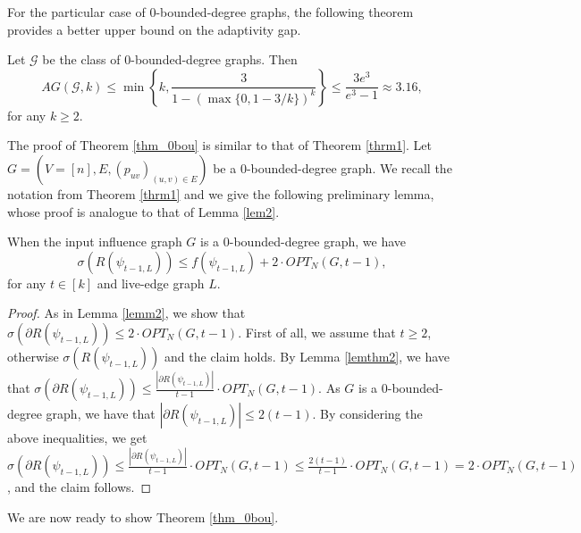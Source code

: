 For the particular case of $0$-bounded-degree graphs, the following theorem provides a better  upper bound on the adaptivity gap.
\begin{theorem}\label{thm_0bou}
Let $\mathcal{G}$ be the class of $0$-bounded-degree graphs. Then $$AG(\mathcal{G},k)\leq\min\left\{k,\frac{3}{1-(\max\{0,1-3/k\})^k}\right\}\leq \frac{3e^3}{e^{3}-1}\approx 3.16,$$ 
for any $k\geq 2$. 
\end{theorem}
The proof of Theorem \ref{thm_0bou} is similar to that of Theorem \ref{thrm1}. Let $G=(V=[n],E,(p_{uv})_{(u,v)\in E})$ be a $0$-bounded-degree graph. We recall the notation from Theorem \ref{thrm1} and we give the following preliminary lemma, whose proof is analogue to that of Lemma \ref{lem2}. 
\begin{lemma}\label{lem_0bou}
When the input influence graph $G$ is a $0$-bounded-degree graph, we have  
\begin{equation}
\sigma(R(\psi_{t-1,L}))\leq f(\psi_{t-1,L})+2\cdot OPT_N(G,t-1),
\end{equation}
for any $t\in [k]$ and live-edge graph $L$.
\end{lemma}
\begin{proof}
As in Lemma \ref{lemm2}, we show that $\sigma(\partial R(\psi_{t-1,L}))\leq 2\cdot OPT_N(G,t-1)$. First of all, we assume that $t\geq 2$, otherwise $\sigma(R(\psi_{t-1,L}))$ and the claim holds. By Lemma \ref{lemthm2}, we have that $\sigma(\partial R(\psi_{t-1,L}))\leq \frac{|\partial R(\psi_{t-1,L})|}{t-1}\cdot OPT_N(G,t-1)$. As $G$ is a $0$-bounded-degree graph, we have that $|\partial R(\psi_{t-1,L})|\leq 2(t-1)$. By considering the above  inequalities, we get $\sigma(\partial R(\psi_{t-1,L}))\leq \frac{|\partial R(\psi_{t-1,L})|}{t-1}\cdot OPT_N(G,t-1)\leq \frac{2(t-1)}{t-1}\cdot OPT_N(G,t-1)=2\cdot OPT_N(G,t-1)$, and the claim follows. 
\end{proof}
We are now ready to show Theorem \ref{thm_0bou}. 
